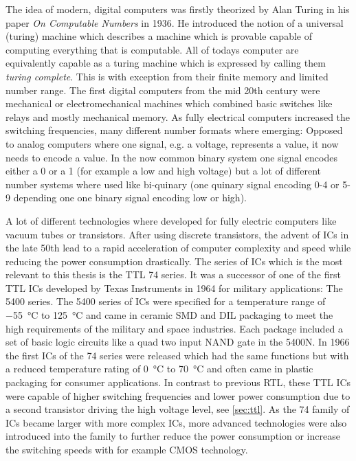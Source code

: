 The idea of modern, digital computers was firstly theorized by Alan Turing in his paper \emph{On Computable Numbers} in 1936. \cite{10.1112/plms/s2-42.1.230}
He introduced the notion of a universal (turing) machine which describes a machine which is provable capable of computing everything that is computable.
All of todays computer are equivalently capable as a turing machine which is expressed by calling them \emph{turing complete}.
This is with exception from their finite memory and limited number range.
The first digital computers from the mid 20th century were mechanical or electromechanical machines which combined basic switches like relays and mostly mechanical memory.
As fully electrical computers increased the switching frequencies, many different number formats where emerging:
Opposed to analog computers where one signal, e.g. a voltage, represents a value, it now needs to encode a value.
In the now common binary system one signal encodes either a 0 or a 1 (for example a low and high voltage) but a lot of different number systems where used like bi-quinary (one quinary signal encoding 0-4 or 5-9 depending one one binary signal encoding low or high).

A lot of different technologies where developed for fully electric computers like vacuum tubes or transistors.
After using discrete transistors, the advent of \glspl{IC} in the late 50th lead to a rapid acceleration of computer complexity and speed while reducing the power consumption drastically.
The series of \glspl{IC} which is the most relevant to this thesis is the \gls{TTL} 74 series.
It was a successor of one of the first \gls{TTL} \glspl{IC} developed by Texas Instruments in 1964 for military applications: The 5400 series. \cite{ICs}
The 5400 series of \glspl{IC} were specified for a temperature range of \qty{-55}{\celsius} to \qty{+125}{\celsius} and came in ceramic \gls{SMD} and \gls{DIL} packaging to meet the high requirements of the military and space industries.
Each package included a set of basic logic circuits like a quad two input NAND gate in the 5400N.
In 1966 the first \glspl{IC} of the 74 series were released which had the same functions but with a reduced temperature rating of \qty{0}{\celsius} to \qty{+70}{\celsius} and often came in plastic packaging for consumer applications.
In contrast to previous \gls{RTL}, these \gls{TTL} \glspl{IC} were capable of higher switching frequencies and lower power consumption due to a second transistor driving the high voltage level, see \cref{sec:ttl}.
As the 74 family of \glspl{IC} became larger with more complex \glspl{IC}, more advanced technologies were also introduced into the family to further reduce the power consumption or increase the switching speeds with for example \gls{CMOS} technology.

